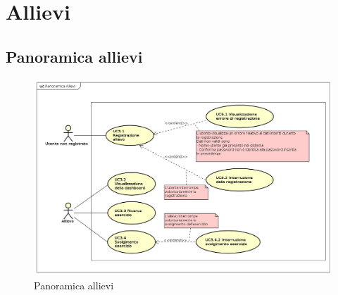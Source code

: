 \section{Allievi}
\subsection{Panoramica allievi}
\begin{figure}[H]
\centering
\includegraphics[width=17cm]{img/Panoramica Allievi.png} 
\caption{Panoramica allievi}\label{fig:31}
\end{figure}

